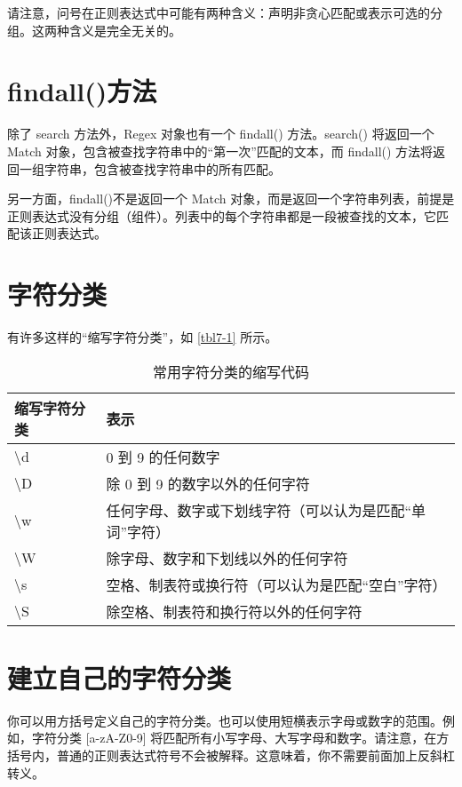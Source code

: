 \begin{tcolorbox}
    请注意，问号在正则表达式中可能有两种含义：声明非贪心匹配或表示可选的分组。这两种含义是完全无关的。
\end{tcolorbox}
\section{findall()方法}
除了 search 方法外，Regex 对象也有一个 findall() 方法。search() 将返回一个Match 对象，包含被查找字符串中的“第一次”匹配的文本，而 findall() 方法将返回一组字符串，包含被查找字符串中的所有匹配。

另一方面，findall()不是返回一个 Match 对象，而是返回一个字符串列表，前提是正则表达式没有分组（组件）。列表中的每个字符串都是一段被查找的文本，它匹配该正则表达式。
\section{字符分类}
有许多这样的“缩写字符分类”，如 \autoref{tbl7-1} 所示。
\begin{table}
    \centering
    \caption{常用字符分类的缩写代码}
    \label{tbl7-1}
    \begin{tabular}{ll}
        \hline
        缩写字符分类           & 表示                           \\
        \hline
        \textbackslash d & 0 到 9 的任何数字                  \\
        \textbackslash D & 除 0 到 9 的数字以外的任何字符           \\
        \textbackslash w & 任何字母、数字或下划线字符（可以认为是匹配“单词”字符） \\
        \textbackslash W & 除字母、数字和下划线以外的任何字符            \\
        \textbackslash s & 空格、制表符或换行符（可以认为是匹配“空白”字符）    \\
        \textbackslash S & 除空格、制表符和换行符以外的任何字符           \\
        \hline
    \end{tabular}
\end{table}
\section{建立自己的字符分类}
你可以用方括号定义自己的字符分类。也可以使用短横表示字母或数字的范围。例如，字符分类 [a-zA-Z0-9] 将匹配所有小写字母、大写字母和数字。请注意，在方括号内，普通的正则表达式符号不会被解释。这意味着，你不需要前面加上反斜杠转义。

